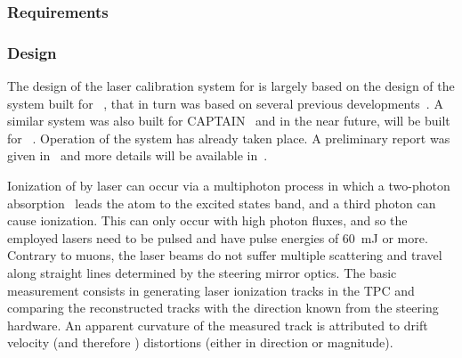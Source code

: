 




\subsubsection{Requirements}
\label{sec:sp-calib-laser-req}



\subsubsection{Design}
\label{sec:sp-calib-sys-las-ion-des}

The design of the laser calibration system for  is largely based on the design of the system built for ~\cite{microboone}, that in turn was based on several previous developments~\cite{Rossi:2009im,Zeller:2013sva,Ereditato:2014lra,Ereditato:82014tya}. A similar system was also built for CAPTAIN~\cite{Berns:2013usa} and in the near future, will be built for ~\cite{Antonello:2015lea}. Operation of the  system has already taken place. A preliminary report was given in~\cite{bib:chen2018} and more details will be available in~\cite{bib:uBlaser2019}.

Ionization of  by laser can occur via a multiphoton process in which a two-photon absorption~\cite{Badhrees:2010zz} leads the atom to the excited states band, and a third photon can cause ionization. This can only occur with high photon fluxes, and so the employed lasers need to be pulsed and have pulse energies of \SI{60}{\milli\joule} or more. Contrary to muons, the laser beams do not suffer multiple scattering and travel along straight lines determined by the steering mirror optics. The basic measurement consists in %
generating laser ionization tracks in the TPC and comparing the reconstructed tracks with the direction known from the steering hardware. 
An apparent curvature of the measured track is attributed to drift velocity (and therefore \efield) distortions (either in direction or magnitude).

